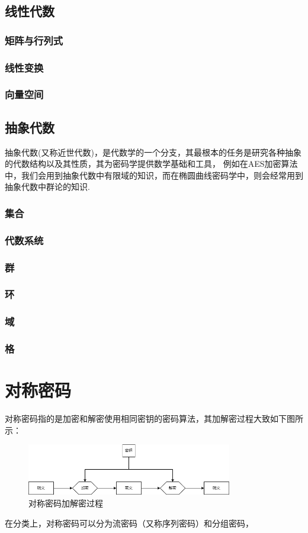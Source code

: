 \documentclass{book}
\numberwithin{equation}{subsubsection}
\begin{document}
\newpage
\section{线性代数}

\subsection{矩阵与行列式}
\subsection{线性变换}
\subsection{向量空间}

\newpage
\section{抽象代数}
抽象代数(又称近世代数)，是代数学的一个分支，其最根本的任务是研究各种抽象的代数结构以及其性质，其为密码学提供数学基础和工具，
例如在AES加密算法中，我们会用到抽象代数中有限域的知识，而在椭圆曲线密码学中，则会经常用到抽象代数中群论的知识.\par
\subsection{集合}

\subsection{代数系统}
\subsection{群}
\subsection{环}
\subsection{域}
\subsection{格}

\newpage
\chapter{对称密码}
对称密码指的是加密和解密使用相同密钥的密码算法，其加解密过程大致如下图所示：\par
\begin{figure}[h]
    \centering
    \includegraphics[width=0.8\textwidth]{Picture/Symmetric.png}
    \caption{对称密码加解密过程}
\end{figure}
在分类上，对称密码可以分为流密码（又称序列密码）和分组密码，
\end{document}
